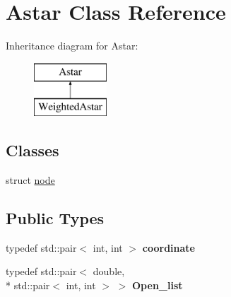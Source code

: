 \hypertarget{classAstar}{\section{Astar Class Reference}
\label{classAstar}
}
Inheritance diagram for Astar\-:\begin{figure}[H]
\begin{center}
\leavevmode
\includegraphics[height=2.000000cm]{classAstar}
\end{center}
\end{figure}
\subsection*{Classes}
\begin{DoxyCompactItemize}
\item 
struct \hyperlink{structAstar_1_1node}{node}
\end{DoxyCompactItemize}
\subsection*{Public Types}
\begin{DoxyCompactItemize}
\item 
\hypertarget{classAstar_a04e8b99eac6befb77c852c6f4155750a}{typedef std\-::pair$<$ int, int $>$ {\bfseries coordinate}}\label{classAstar_a04e8b99eac6befb77c852c6f4155750a}

\item 
\hypertarget{classAstar_a17c239ece99dd7cb5a92f5cf1404ff5d}{typedef std\-::pair$<$ double, \\*
std\-::pair$<$ int, int $>$ $>$ {\bfseries Open\-\_\-list}}\label{classAstar_a17c239ece99dd7cb5a92f5cf1404ff5d}

\end{DoxyCompactItemize}
